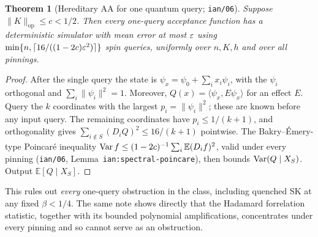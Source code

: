 \documentclass[11pt]{article}
\newtheorem{theorem}{Theorem}[section]
\theoremstyle{definition}\newtheorem{definition}[theorem]{Definition}
\theoremstyle{remark}\newtheorem{remark}[theorem]{Remark}
\newcommand{\E}{\mathbb E}\newcommand{\Prb}{\mathbb P}
\begin{document}
\begin{theorem}[Hereditary AA for one quantum query; \texttt{ian/06}]\label{dist:one-query}
Suppose \(\|K\|_{\mathrm{op}}\le c<1/2\). Then every one-query acceptance
function has a deterministic simulator with mean error at most \(\varepsilon\) using
\(\min\{n,\lceil16/((1-2c)\varepsilon^2)\rceil\}\) spin queries, uniformly over
\(n,K,h\) and over all pinnings.
\end{theorem}
\begin{proof}
After the single query the state is \(\psi_x=\psi_0+\sum_ix_i\psi_i\), with the
\(\psi_i\) orthogonal and \(\sum_i\|\psi_i\|^2=1\). Moreover,
\(Q(x)=\langle\psi_x,E\psi_x\rangle\) for an effect \(E\). Query the \(k\)
coordinates with the largest \(p_i=\|\psi_i\|^2\); these are known before any
input query. The remaining coordinates have \(p_i\le1/(k+1)\), and
orthogonality gives \(\sum_{i\notin S}(D_iQ)^2\le16/(k+1)\) pointwise. The
Bakry--Émery-type Poincaré inequality
\(\Var f\le(1-2c)^{-1}\sum_i\E(D_if)^2\), valid under every pinning
(\texttt{ian/06}, Lemma~\texttt{ian:spectral-poincare}), then bounds
\(\operatorname{Var}(Q\mid X_S)\). Output \(\E[Q\mid X_S]\).
\end{proof}
This rules out \emph{every} one-query obstruction in the class, including
quenched SK at any fixed \(\beta<1/4\). The same note shows directly that the
Hadamard forrelation statistic, together with its bounded polynomial
amplifications, concentrates under every pinning and so cannot serve as an
obstruction.
\end{document}
